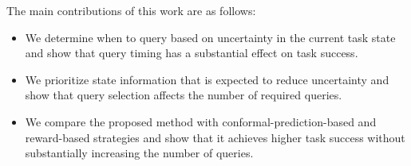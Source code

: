 The main contributions of this work are as follows:

\begin{itemize}

\item We determine when to query based on uncertainty in the current task state and show that query timing has a substantial effect on task success.

\item We prioritize state information that is expected to reduce uncertainty and show that query selection affects the number of required queries.

\item We compare the proposed method with conformal-prediction-based and reward-based strategies and show that it achieves higher task success without substantially increasing the number of queries.

\end{itemize}
